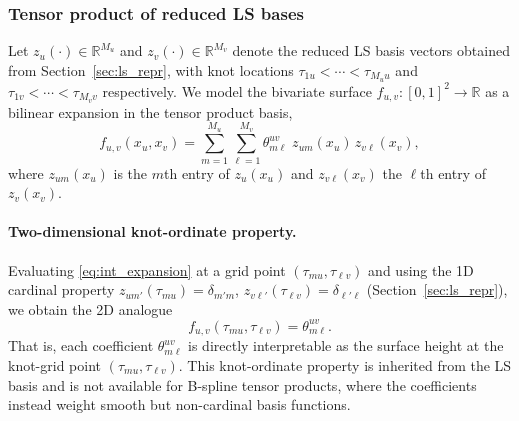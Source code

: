 \subsubsection{Tensor product of reduced LS bases}\label{sec:int_tensor}
Let $z_u(\cdot)\in\mathbb{R}^{M_u}$ and $z_v(\cdot)\in\mathbb{R}^{M_v}$ denote the reduced LS
basis vectors obtained from Section~\ref{sec:ls_repr}, with knot locations
$\tau_{1u}<\cdots<\tau_{M_u u}$ and $\tau_{1v}<\cdots<\tau_{M_v v}$ respectively. We model
the bivariate surface $f_{u,v}:[0,1]^2\to\mathbb{R}$ as a bilinear expansion in the tensor
product basis,
\begin{equation}
f_{u,v}(x_u,x_v)
=\sum_{m=1}^{M_u}\sum_{\ell=1}^{M_v}
\theta^{uv}_{m\ell}\;z_{um}(x_u)\,z_{v\ell}(x_v),
\label{eq:int_expansion}
\end{equation}
where $z_{um}(x_u)$ is the $m$th entry of $z_u(x_u)$ and $z_{v\ell}(x_v)$ the $\ell$th entry
of $z_v(x_v)$.

\paragraph{Two-dimensional knot-ordinate property.}
Evaluating \eqref{eq:int_expansion} at a grid point $(\tau_{mu},\tau_{\ell v})$ and using the
1D cardinal property $z_{um'}(\tau_{mu})=\delta_{m'm}$,
$z_{v\ell'}(\tau_{\ell v})=\delta_{\ell'\ell}$ (Section~\ref{sec:ls_repr}), we obtain the
2D analogue
\begin{equation}
f_{u,v}(\tau_{mu},\tau_{\ell v})=\theta^{uv}_{m\ell}.
\label{eq:int_knot_ordinate}
\end{equation}
That is, each coefficient $\theta^{uv}_{m\ell}$ is directly interpretable as the surface
height at the knot-grid point $(\tau_{mu},\tau_{\ell v})$. This knot-ordinate property is
inherited from the LS basis and is not available for B-spline tensor products, where the
coefficients instead weight smooth but non-cardinal basis functions.

